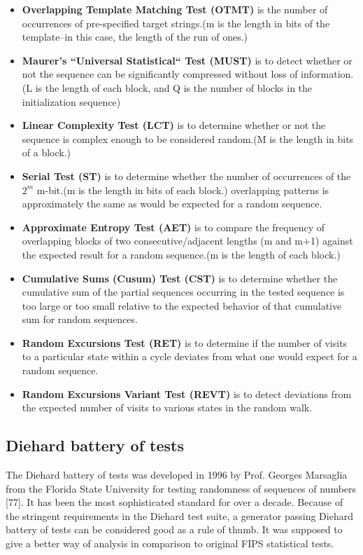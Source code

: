 \begin{itemize}
\item \textbf{Overlapping Template Matching Test (OTMT)} is the number of occurrences of pre-specified target strings.(m is the length in bits of the template--in this case, the length of the run of ones.)

\item \textbf{Maurer's ``Universal Statistical`` Test (MUST)} is to detect whether or not the sequence can be
significantly compressed without loss of information.(L is the length of each block, and Q is the number of blocks in the initialization sequence)

\item \textbf{Linear Complexity Test (LCT)} is to determine whether or not the sequence is complex enough to be considered random.(M is the length in bits of a block.)

\item \textbf{Serial Test (ST)} is to determine whether the number of occurrences of the $2^{m}$ m-bit.(m is the length in bits of each block.)
overlapping patterns is approximately the same as would be expected for a random sequence.

\item \textbf{Approximate Entropy Test (AET)} is to compare the frequency of overlapping blocks of two consecutive/adjacent lengths (m and m+1) against the expected result for a random sequence.(m is the length of each block.)

\item \textbf{Cumulative Sums (Cusum) Test (CST)} is to determine whether the cumulative sum of the partial sequences occurring in the tested sequence is too large or too small relative to the expected behavior of that cumulative sum for random sequences.

\item \textbf{Random Excursions Test (RET)} is to determine if the number of visits to a particular state within a cycle deviates from what one would expect for a random
sequence.

\item \textbf{Random Excursions Variant Test (REVT)} is to detect deviations from the expected number
of visits to various states in the random walk.
\end{itemize}

\subsection{Diehard battery of tests}
The Diehard battery of tests was developed in 1996 by Prof. Georges Marsaglia
from the Florida State University for testing randomness of sequences of numbers
[77]. 
It has been the most sophisticated standard for over a decade. Because of the stringent requirements in the Diehard test suite, a generator passing Diehard battery of 
tests can be considered good as a rule of thumb. It was supposed to give a better way of analysis in comparison to original FIPS statistical tests.

